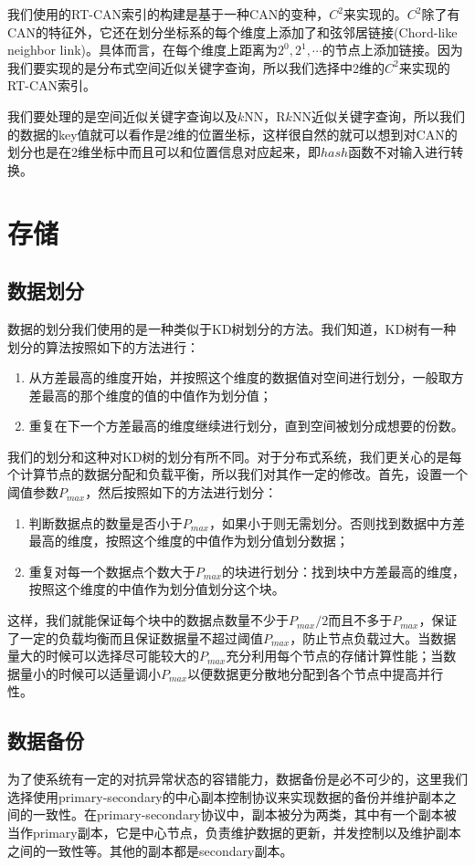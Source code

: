 \documentclass{ML}
\begin{document}
我们使用的RT-CAN索引的构建是基于一种CAN的变种，$C^2$来实现的。$C^2$除了有CAN的特征外，它还在划分坐标系的每个维度上添加了和弦邻居链接(Chord-like neighbor link)。具体而言，在每个维度上距离为$2^0,2^1,\cdots$的节点上添加链接。因为我们要实现的是分布式空间近似关键字查询，所以我们选择中2维的$C^2$来实现的RT-CAN索引。

我们要处理的是空间近似关键字查询以及$k$NN，R$k$NN近似关键字查询，所以我们的数据的key值就可以看作是2维的位置坐标，这样很自然的就可以想到对CAN的划分也是在2维坐标中而且可以和位置信息对应起来，即$hash$函数不对输入进行转换。

\section{存储}
\subsection{数据划分}\label{sec:data-partition}
数据的划分我们使用的是一种类似于KD树划分的方法。我们知道\cite{KD-Tree-Partition}，KD树有一种划分的算法按照如下的方法进行：
\begin{enumerate}
  \item 从方差最高的维度开始，并按照这个维度的数据值对空间进行划分，一般取方差最高的那个维度的值的中值作为划分值；
  \item 重复在下一个方差最高的维度继续进行划分，直到空间被划分成想要的份数。 
\end{enumerate}
我们的划分和这种对KD树的划分有所不同。对于分布式系统，我们更关心的是每个计算节点的数据分配和负载平衡，所以我们对其作一定的修改。首先，设置一个阈值参数$P_{max}$，然后按照如下的方法进行划分：
\begin{enumerate}
  \item 判断数据点的数量是否小于$P_{max}$，如果小于则无需划分。否则找到数据中方差最高的维度，按照这个维度的中值作为划分值划分数据；
  \item 重复对每一个数据点个数大于$P_{max}$的块进行划分：找到块中方差最高的维度，按照这个维度的中值作为划分值划分这个块。 
\end{enumerate}
这样，我们就能保证每个块中的数据点数量不少于$P_{max}/2$而且不多于$P_{max}$，保证了一定的负载均衡而且保证数据量不超过阈值$P_{max}$，防止节点负载过大。当数据量大的时候可以选择尽可能较大的$P_{max}$充分利用每个节点的存储计算性能；当数据量小的时候可以适量调小$P_{max}$以便数据更分散地分配到各个节点中提高并行性。
\subsection{数据备份}
为了使系统有一定的对抗异常状态的容错能力，数据备份是必不可少的，这里我们选择使用primary-secondary的中心副本控制协议来实现数据的备份并维护副本之间的一致性。在primary-secondary协议中，副本被分为两类，其中有一个副本被当作primary副本，它是中心节点，负责维护数据的更新，并发控制以及维护副本之间的一致性等。其他的副本都是secondary副本。
\end{document}
